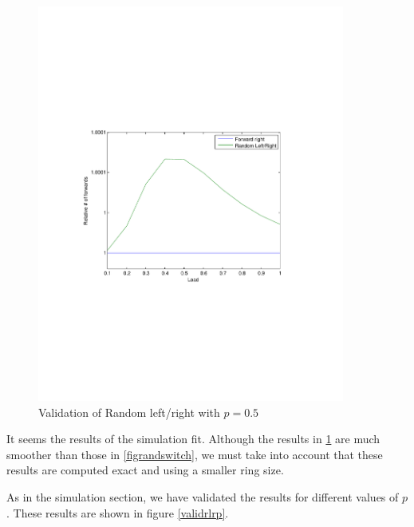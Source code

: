\documentclass[10pt,a4paper]{article}
\begin{document}
\begin{figure}[h!tb]
\centering
\includegraphics[clip=true, trim=9em 24em 9em 24em, width=0.9\textwidth]{resources/plotrandlr.pdf}
\caption{Validation of Random left/right with $p=0.5$}
\label{validrlr}
\end{figure}

It seems the results of the simulation fit. Although the results in \ref{validrlr} are much smoother than those in \ref{figrandswitch}, we must take into account that these results are computed exact and using a smaller ring size.

As in the simulation section, we have validated the results for different values of $p$. These results are shown in figure \ref{validrlrp}.
\end{document}

